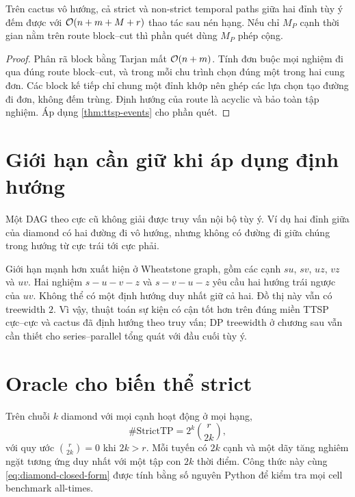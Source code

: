 \begin{theorem}
\label{thm:cactus}
Trên cactus vô hướng, cả strict và non-strict temporal paths giữa hai đỉnh tùy ý đếm được với $\mathcal{O}(n+m+M+r)$ thao tác sau nén hạng. Nếu chỉ $M_P$ cạnh thời gian nằm trên route block--cut thì phần quét dùng $M_P$ phép cộng.
\end{theorem}

\begin{proof}
Phân rã block bằng Tarjan mất $\mathcal{O}(n+m)$. Tính đơn buộc mọi nghiệm đi qua đúng route block--cut, và trong mỗi chu trình chọn đúng một trong hai cung đơn. Các block kế tiếp chỉ chung một đỉnh khớp nên ghép các lựa chọn tạo đường đi đơn, không đếm trùng. Định hướng của route là acyclic và bảo toàn tập nghiệm. Áp dụng \cref{thm:ttsp-events} cho phần quét.
\end{proof}

\section{Giới hạn cần giữ khi áp dụng định hướng}

Một DAG theo cực cũ không giải được truy vấn nội bộ tùy ý. Ví dụ hai đỉnh giữa của diamond có hai đường đi vô hướng, nhưng không có đường đi giữa chúng trong hướng từ cực trái tới cực phải.

Giới hạn mạnh hơn xuất hiện ở Wheatstone graph, gồm các cạnh $su$, $sv$, $uz$, $vz$ và $uv$. Hai nghiệm $s-u-v-z$ và $s-v-u-z$ yêu cầu hai hướng trái ngược của $uv$. Không thể có một định hướng duy nhất giữ cả hai. Đồ thị này vẫn có treewidth $2$. Vì vậy, thuật toán sự kiện có cận tốt hơn trên đúng miền TTSP cực--cực và cactus đã định hướng theo truy vấn; DP treewidth ở chương sau vẫn cần thiết cho series--parallel tổng quát với đầu cuối tùy ý.

\section{Oracle cho biến thể strict}

Trên chuỗi $k$ diamond với mọi cạnh hoạt động ở mọi hạng,
\[
  \#\mathrm{StrictTP}=2^k\binom{r}{2k},
\]
với quy ước $\binom{r}{2k}=0$ khi $2k>r$. Mỗi tuyến có $2k$ cạnh và một dãy tăng nghiêm ngặt tương ứng duy nhất với một tập con $2k$ thời điểm. Công thức này cùng \cref{eq:diamond-closed-form} được tính bằng số nguyên Python để kiểm tra mọi cell benchmark all-times.
